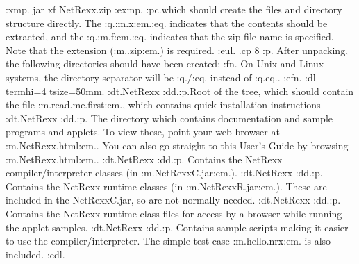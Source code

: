:xmp.
jar xf NetRexx.zip
:exmp.
:pc.which should create the files and directory structure directly.
The :q.:m.x:em.:eq. indicates that the contents should be extracted, and
the :q.:m.f:em.:eq. indicates that the zip file name is specified.  Note
that the extension (:m..zip:em.) is required.
:eul.
.cp 8
:p.
After unpacking, the following directories should have been created:
:fn.
On Unix and Linux systems, the directory separator will be :q./:eq.
instead of :q.\:eq..
:efn.
:dl termhi=4 tsize=50mm.
:dt.NetRexx
:dd.:p.Root of the tree, which should contain the
file :m.read.me.first:em., which contains quick installation
instructions
:dt.NetRexx\browse
:dd.:p.
The directory which contains documentation and sample programs and
applets.
To view these, point your web browser at :m.NetRexx\browse\netrexx.html:em..
You can also go straight to this User's Guide by
browsing :m.NetRexx\browse\nrusers.html:em..
:dt.NetRexx\lib
{}
:dd.:p.
Contains the NetRexx compiler/interpreter classes (in :m.NetRexxC.jar:em.).
:dt.NetRexx\runlib
:dd.:p.
Contains the NetRexx runtime classes (in :m.NetRexxR.jar:em.).  These are
included in the NetRexxC.jar, so are not normally needed.
:dt.NetRexx\netrexx\lang
:dd.:p.
Contains the NetRexx runtime class files for access by a browser while
running the applet samples.
:dt.NetRexx\bin
:dd.:p.
Contains sample scripts making it easier to use the
compiler/interpreter.   The simple test case :m.hello.nrx:em. is also
included.
:edl.
